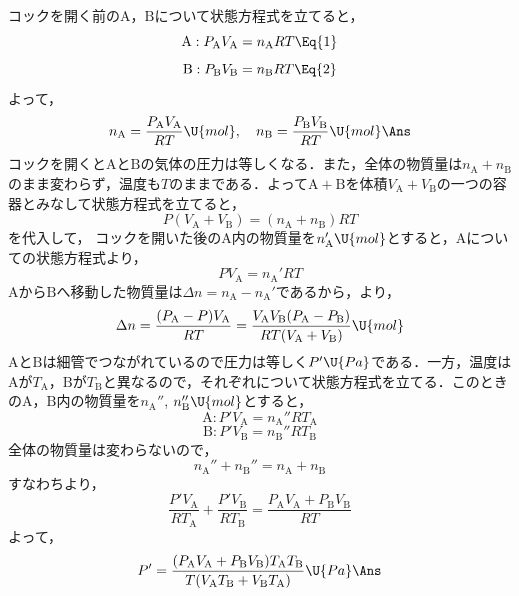\begin{reidaiunit}
\begin{kaitou}
\begin{komon}
 コックを開く前の$\mathrm{A}$，$\mathrm{B}$について状態方程式を立てると，
       \[\mathrm{A}:P_{\mathrm{A}}V_{\mathrm{A}}=n_{\mathrm{A}}RT\Eq{1}\]
       \[\mathrm{B}:P_{\mathrm{B}}V_{\mathrm{B}}=n_{\mathrm{B}}RT\Eq{2}\]
       よって，
       \[n_{\mathrm{A}}=\frac{P_{\mathrm{A}}V_{\mathrm{A}}}{RT}\U{mol}, \quad n_{\mathrm{B}}=\frac{P_{\mathrm{B}}V_{\mathrm{B}}}{RT}\U{mol}\Ans\]
 コックを開くと$\mathrm{A}$と$\mathrm{B}$の気体の圧力は等しくなる．また，全体の物質量は$n_{\mathrm{A}}+n_{\mathrm{B}}$のまま変わらず，温度も$T$のままである．よって$\mathrm{A}+\mathrm{B}$を体積$V_{\mathrm{A}}+V_{\mathrm{B}}$の一つの容器とみなして状態方程式を立てると，
       \[P(V_{\mathrm{A}}+V_{\mathrm{B}})=(n_{\mathrm{A}}+n_{\mathrm{B}})RT\]
       を代入して，
 コックを開いた後の$\mathrm{A}$内の物質量を$n_{\mathrm{A}}'\U{mol}$とすると，$\mathrm{A}$についての状態方程式より，
       \[PV_{\mathrm{A}}=n_{\mathrm{A}}'RT\]
       $\mathrm{A}$から$\mathrm{B}$へ移動した物質量は$\Delta n=n_{\mathrm{A}}-n_{\mathrm{A}}'$であるから，より，
       \[\Delta n=\frac{(P_{\mathrm{A}}-P)V_{\mathrm{A}}}{RT}=\frac{V_{\mathrm{A}}V_{\mathrm{B}}(P_{\mathrm{A}}-P_{\mathrm{B}})}{RT(V_{\mathrm{A}}+V_{\mathrm{B}})}\U{mol}\]
       \hspace*{\fill}\Ans
{} $\mathrm{A}$と$\mathrm{B}$は細管でつながれているので圧力は等しく$P'\U{Pa}$である．一方，温度は$\mathrm{A}$が$T_{\mathrm{A}}$，$\mathrm{B}$が$T_{\mathrm{B}}$と異なるので，それぞれについて状態方程式を立てる．このときの$\mathrm{A}$，$\mathrm{B}$内の物質量を$n_{\mathrm{A}}''$, $n_{\mathrm{B}}''\U{mol}$とすると，
       \[\mathrm{A}:P'V_{\mathrm{A}}=n_{\mathrm{A}}''RT_{\mathrm{A}}\]
       \[\mathrm{B}:P'V_{\mathrm{B}}=n_{\mathrm{B}}''RT_{\mathrm{B}}\]
       \hspace{1zw}全体の物質量は変わらないので，
       \[n_{\mathrm{A}}''+n_{\mathrm{B}}''=n_{\mathrm{A}}+n_{\mathrm{B}}\]
       すなわちより，
       \[\frac{P'V_{\mathrm{A}}}{RT_{\mathrm{A}}}+\frac{P'V_{\mathrm{B}}}{RT_{\mathrm{B}}}=\frac{P_{\mathrm{A}}V_{\mathrm{A}}+P_{\mathrm{B}}V_{\mathrm{B}}}{RT}\]
       よって，
       \[P'=\frac{(P_{\mathrm{A}}V_{\mathrm{A}}+P_{\mathrm{B}}V_{\mathrm{B}})T_{\mathrm{A}}T_{\mathrm{B}}}{T(V_{\mathrm{A}}T_{\mathrm{B}}+V_{\mathrm{B}}T_{\mathrm{A}})}\U{Pa}\Ans\]
\end{komon}
\end{kaitou}
\end{reidaiunit}

